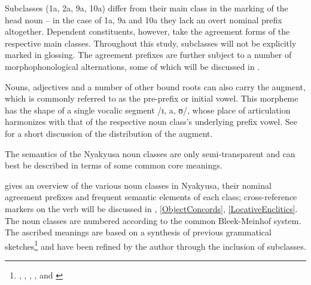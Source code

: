 Subclasses (1a, 2a, 9a, 10a) differ from their main class in the marking of the head noun -- in the case of 1a, 9a and 10a they lack an overt nominal prefix altogether. Dependent constituents, however, take the agreement forms of the respective main classes. Throughout this study, subclasses will not be explicitly marked in glossing. The agreement prefixes are further subject to a number of morphophonological alternations, some of which will be discussed in . 

Nouns, adjectives and a number of other bound roots can also carry the augment, which is commonly referred to as the pre-prefix or initial vowel. This morpheme has the shape of a single vocalic segment /ɪ, a, ʊ/, whose place of articulation harmonizes with that of the respective noun class's underlying prefix vowel. See  for a short discussion of the distribution of the augment.

The semantics of the Nyakyusa noun classes are only semi-transparent and can best be described in terms of some common core meanings.

 gives an overview of the various noun classes in Nyakyusa, their nominal agreement prefixes and frequent semantic elements of each class; cross-reference markers on the verb will be discussed in , \ref{ObjectConcords}, \ref{LocativeEnclitics}. The noun classes are numbered according to the common Bleek-Meinhof system. The ascribed meanings are based on a synthesis of previous grammatical sketches\footnote{\citet{SchumannK1899},  \citet{MeinhofC1966}, \citet{EndemannC1914}, \citet{NurseD1979}, \citet{LusekeloA2007} and \citet{FelbergK1996}} and have been refined by the author through the inclusion of subclasses.


